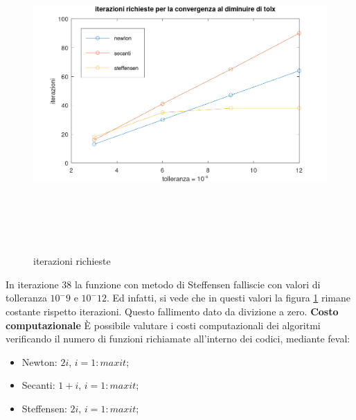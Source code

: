 \begin{figure}[!ht]
        \centering
        \includegraphics[width=16cm,height=12cm,keepaspectratio]{capitolo2/es7_figure.png}
        \caption{iterazioni richieste}
        \label{fig:es7}
\end{figure}
\FloatBarrier
In iterazione $38$ la funzione con metodo di Steffensen falliscie con valori di tolleranza
$10^-9$ e $10^-12$. Ed infatti, si vede che in questi valori la figura \ref{fig:es7}
rimane costante rispetto iterazioni. Questo fallimento dato da divizione a zero.
\newline \textbf{Costo computazionale} \newline
È possibile valutare i costi computazionali dei algoritmi verificando il numero
di funzioni richiamate all'interno dei codici, mediante feval:
\begin{itemize}
        \item Newton: $2i$, $i=1:maxit$;
        \item Secanti: $1 + i$, $i=1:maxit$;
        \item Steffensen: $2i$, $i=1:maxit$;
\end{itemize}
